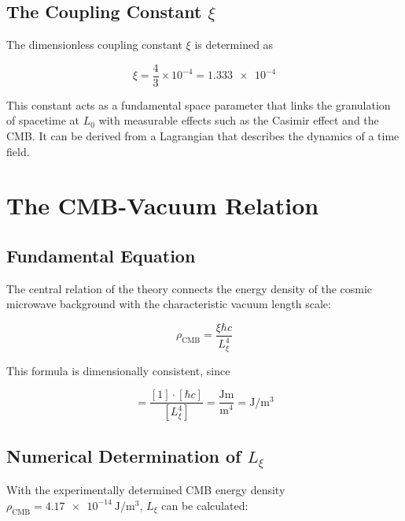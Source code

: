 	\subsection{The Coupling Constant \( \xi \)}
	
	The dimensionless coupling constant \( \xi \) is determined as
	
	\begin{equation}
		\xi = \frac{4}{3} \times 10^{-4} = \num{1.333e-4} \label{eq:coupling_constant}
	\end{equation}
	
	This constant acts as a fundamental space parameter that links the granulation of spacetime at \( L_0 \) with measurable effects such as the Casimir effect and the CMB. It can be derived from a Lagrangian that describes the dynamics of a time field.
	
	\section{The CMB-Vacuum Relation}
	
	\subsection{Fundamental Equation}
	
	The central relation of the theory connects the energy density of the cosmic microwave background with the characteristic vacuum length scale:
	
	\begin{equation}
		\rho_{\text{CMB}} = \frac{\xi \hbar c}{L_\xi^4} \label{eq:cmb_vacuum_relation}
	\end{equation}
	
	This formula is dimensionally consistent, since
	
	\begin{equation}
		[\rho_{\text{CMB}}] = \frac{[1] \cdot [\hbar c]}{[L_\xi^4]} = \frac{\si{\joule\meter}}{\si{\meter^4}} = \si{\joule\per\meter^3}
	\end{equation}
	
	\subsection{Numerical Determination of \( L_\xi \)}
	
	With the experimentally determined CMB energy density \( \rho_{\text{CMB}} = \SI{4.17e-14}{\joule\per\meter^3} \), \( L_\xi \) can be calculated:
	

